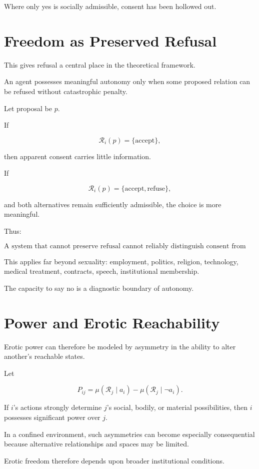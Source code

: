 \documentclass[11pt,oneside]{book}
\theoremstyle{definition}
\theoremstyle{remark}
\newcommand{\R}{\mathcal{R}}
\begin{document}
Where only yes is socially admissible, consent has been hollowed out.

\section{Freedom as Preserved Refusal}

This gives refusal a central place in the theoretical framework.

An agent possesses meaningful autonomy only when some proposed relation can be refused without catastrophic penalty.

Let proposal be \(p\).

If

\[
\R_i(p)
=
\{\text{accept}\},
\]

then apparent consent carries little information.

If

\[
\R_i(p)
=
\{\text{accept},\text{refuse}\},
\]

and both alternatives remain sufficiently admissible, the choice is more meaningful.

Thus:

\[
\boxed{
\text{A system that cannot preserve refusal cannot reliably distinguish consent from compliance.}
}
\]

This applies far beyond sexuality: employment, politics, religion, technology, medical treatment, contracts, speech, institutional membership.

The capacity to say no is a diagnostic boundary of autonomy.

\section{Power and Erotic Reachability}

Erotic power can therefore be modeled by asymmetry in the ability to alter another's reachable states.

Let

\[
P_{ij}
=
\mu
\left(
\R_j\mid a_i
\right)
-
\mu
\left(
\R_j\mid \neg a_i
\right).
\]

If \(i\)'s actions strongly determine \(j\)'s social, bodily, or material possibilities, then \(i\) possesses significant power over \(j\).

In a confined environment, such asymmetries can become especially consequential because alternative relationships and spaces may be limited.

Erotic freedom therefore depends upon broader institutional conditions.
\end{document}
